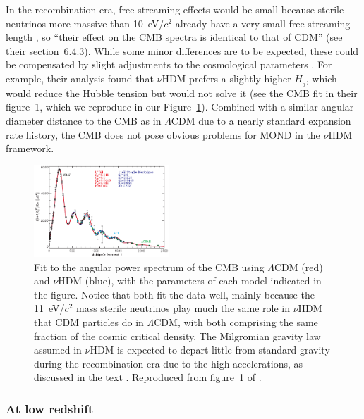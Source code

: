 \documentclass[fleqn,usenatbib,useAMS]{mnras} %
\begin{document}
In the recombination era, free streaming effects would be small because sterile neutrinos more massive than 10~eV/$c^2$ already have a very small free streaming length \citep{Planck_2016}, so ``their effect on the CMB spectra is identical to that of CDM'' (see their section~6.4.3). While some minor differences are to be expected, these could be compensated by slight adjustments to the cosmological parameters \citep{Angus_Diaferio_2011}. For example, their analysis found that $\nu$HDM prefers a slightly higher $H_{_0}$, which would reduce the Hubble tension but would not solve it (see the CMB fit in their figure~1, which we reproduce in our Figure~\ref{Angus_Diaferio_2011_Figure_1}). Combined with a similar angular diameter distance to the CMB as in $\Lambda$CDM due to a nearly standard expansion rate history, the CMB does not pose obvious problems for MOND in the $\nu$HDM framework.

\begin{figure}
	\centering
	\includegraphics[width=0.45\textwidth]{Angus_Diaferio_2011_Figure_1}
	\caption{Fit to the angular power spectrum of the CMB using $\Lambda$CDM (red) and $\nu$HDM (blue), with the parameters of each model indicated in the figure. Notice that both fit the data well, mainly because the 11~eV/$c^2$ mass sterile neutrinos play much the same role in $\nu$HDM that CDM particles do in $\Lambda$CDM, with both comprising the same fraction of the cosmic critical density. The Milgromian gravity law assumed in $\nu$HDM is expected to depart little from standard gravity during the recombination era due to the high accelerations, as discussed in the text \citep[see also][]{Haslbauer_2020}. Reproduced from figure~1 of \citet{Angus_Diaferio_2011}.}
	\label{Angus_Diaferio_2011_Figure_1}
\end{figure}


\subsubsection{At low redshift}
\label{nuHDM_late}
\end{document}
